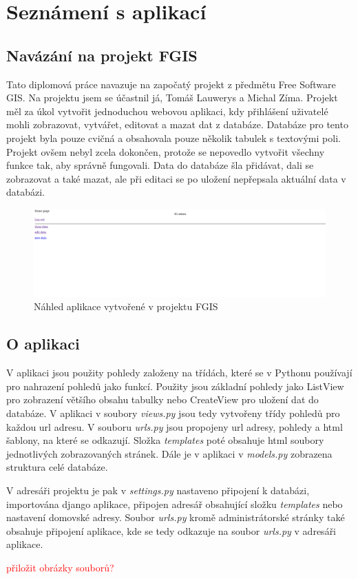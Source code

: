\chapter{Seznámení s aplikací}
\label{3-seznameni-s-aplikaci}

\section{Navázání na projekt FGIS}

Tato diplomová práce navazuje na započatý projekt z předmětu Free Software GIS. Na projektu jsem se účastnil já, Tomáš Lauwerys a Michal Zíma. Projekt měl za úkol vytvořit jednoduchou webovou aplikaci, kdy přihlášení uživatelé mohli zobrazovat, vytvářet, editovat a mazat dat z databáze. Databáze pro tento projekt byla pouze cvičná a obsahovala pouze několik tabulek s textovými poli. Projekt ovšem nebyl zcela dokončen, protože se nepovedlo vytvořit všechny funkce tak, aby správně fungovali. Data do databáze šla přidávat, dali se zobrazovat a také mazat, ale při editaci se po uložení nepřepsala aktuální data v databázi. 

\begin{figure}[H] \centering
    \includegraphics[width=400pt]{./pictures/4-nahled-menu-fgis.PNG}
    \caption[Náhled aplikace vytvořené v projektu FGIS]{Náhled aplikace vytvořené v projektu FGIS}
	\label{fig:Náhled aplikace}              
\end{figure}

 \newpage
 
 \section{O aplikaci}

V aplikaci jsou použity pohledy založeny na třídách, které se v Pythonu používají pro nahrazení pohledů jako funkcí. Použity jsou základní pohledy jako ListView pro zobrazení většího obsahu tabulky nebo CreateView pro uložení dat do databáze. V aplikaci v soubory \emph{views.py} jsou tedy vytvořeny třídy pohledů pro každou url adresu. V souboru \emph{urls.py} jsou propojeny url adresy, pohledy a html šablony, na které se odkazují. Složka \emph{templates} poté obsahuje html soubory jednotlivých zobrazovaných stránek. Dále je v aplikaci v \emph{models.py} zobrazena struktura celé databáze. 

V adresáři projektu je pak v \emph{settings.py} nastaveno připojení k databázi, importována django aplikace, připojen adresář obsahující složku \emph{templates} nebo nastavení domovské adresy. Soubor \emph{urls.py} kromě administrátorské stránky také obsahuje připojení aplikace, kde se tedy odkazuje na soubor \emph{urls.py} v adresáři aplikace. 

\textcolor{red}{přiložit obrázky souborů?}


